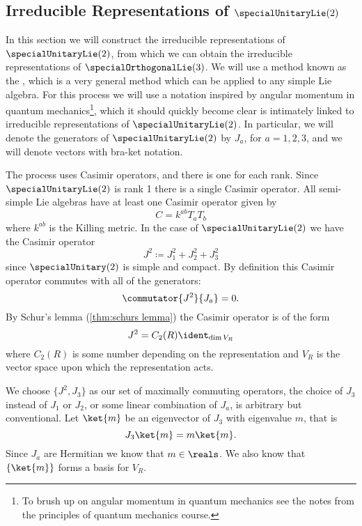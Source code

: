\subsection{Irreducible Representations of \texorpdfstring{\(\specialUnitaryLie(2)\)}{su(2)}}
In this section we will construct the irreducible representations of \(\specialUnitaryLie(2)\), from which we can obtain the irreducible representations of \(\specialOrthogonalLie(3)\).
We will use a method known as the , which is a very general method which can be applied to any simple Lie algebra.
For this process we will use a notation inspired by angular momentum in quantum mechanics\footnote{To brush up on angular momentum in quantum mechanics see the notes from the principles of quantum mechanics course.}, which it should quickly become clear is intimately linked to irreducible representations of \(\specialUnitaryLie(2)\).
In particular, we will denote the generators of \(\specialUnitaryLie(2)\) by \(J_a\), for \(a = 1, 2, 3\), and we will denote vectors with bra-ket notation.

The process uses Casimir operators, and there is one for each rank.
Since \(\specialUnitaryLie(2)\) is rank 1 there is a single Casimir operator.
All semi-simple Lie algebras have at least one Casimir operator given by
\begin{equation}
    C = k^{ab}T_aT_b
\end{equation}
where \(k^{ab}\) is the Killing metric.
In the case of \(\specialUnitaryLie(2)\) we have the Casimir operator
\begin{equation}
    J^2 \coloneqq J_1^2 + J_2^2 + J_3^2
\end{equation}
since \(\specialUnitary(2)\) is simple and compact.
By definition this Casimir operator commutes with all of the generators:
\begin{equation}
    \commutator{J^2}{J_a} = 0.
\end{equation}
By Schur's lemma (\cref{thm:schurs lemma}) the Casimir operator is of the form
\begin{equation}
    J^2 = C_2(R)\ident_{\dim V_R}
\end{equation}
where \(C_2(R)\) is some number depending on the representation and \(V_R\) is the vector space upon which the representation acts.

We choose \(\{J^2, J_3\}\) as our set of maximally commuting operators, the choice of \(J_3\) instead of \(J_1\) or \(J_2\), or some linear combination of \(J_a\), is arbitrary but conventional.
Let \(\ket{m}\) be an eigenvector of \(J_3\) with eigenvalue \(m\), that is
\begin{equation}
    J_3\ket{m} = m\ket{m}.
\end{equation}
Since \(J_a\) are Hermitian we know that \(m \in \reals\).
We also know that \(\{\ket{m}\}\) forms a basis for \(V_R\).

